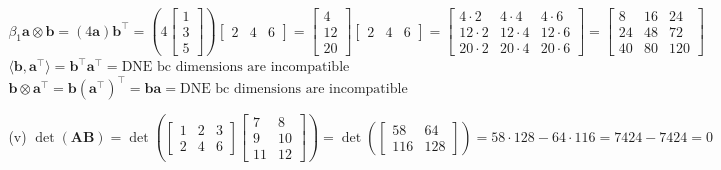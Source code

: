 \documentclass[11pt,letterpaper]{article}
\begin{document}
\begin{enumerate}
\begin{enumerate}
\begin{enumerate}
             $\beta_1 \mathbf{a} \otimes \mathbf{b} = (4\mathbf{a})\mathbf{b}^\top = \left(4 \begin{bmatrix} 1 \\ 3 \\ 5 \end{bmatrix}\right) \begin{bmatrix} 2 & 4 & 6 \end{bmatrix} = \begin{bmatrix} 4 \\ 12 \\ 20 \end{bmatrix} \begin{bmatrix} 2 & 4 & 6 \end{bmatrix} = \begin{bmatrix} 4 \cdot 2 & 4 \cdot 4 & 4 \cdot 6 \\ 12 \cdot 2 & 12 \cdot 4 & 12 \cdot 6 \\ 20 \cdot 2 & 20 \cdot 4 & 20 \cdot 6 \end{bmatrix} = \begin{bmatrix} 8 & 16 & 24 \\ 24 & 48 & 72 \\ 40 & 80 & 120 \end{bmatrix}$\\
             $\langle\mathbf{b}, \mathbf{a}^\top\rangle = \mathbf{b}^\top\mathbf{a}^\top = \text{DNE bc dimensions are incompatible}$\\
             $\mathbf{b} \otimes \mathbf{a}^\top = \mathbf{b}(\mathbf{a}^\top)^\top = \mathbf{b}\mathbf{a} = \text{DNE bc dimensions are incompatible}$
\item [(v)] $\det(\mathbf{AB}) = \det\left(\begin{bmatrix} 1 & 2 & 3 \\ 2 & 4 & 6 \end{bmatrix} \begin{bmatrix} 7 & 8 \\ 9 & 10 \\ 11 & 12 \end{bmatrix}\right) = \det\left(\begin{bmatrix} 58 & 64 \\ 116 & 128 \end{bmatrix}\right) = 58 \cdot 128 - 64 \cdot 116 = 7424 - 7424 = 0$\\

\end{enumerate}
\end{enumerate}
\end{enumerate}
\end{document}
